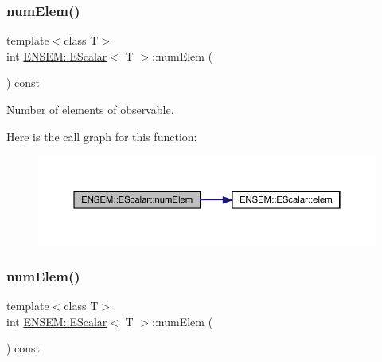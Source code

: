 \subsubsection{\texorpdfstring{numElem()}{numElem()}\hspace{0.1cm}{\footnotesize\ttfamily [1/3]}}
{\footnotesize\ttfamily template$<$class T$>$ \\
int \mbox{\hyperlink{classENSEM_1_1EScalar}{E\+N\+S\+E\+M\+::\+E\+Scalar}}$<$ T $>$\+::num\+Elem (\begin{DoxyParamCaption}{ }\end{DoxyParamCaption}) const\hspace{0.3cm}{\ttfamily [inline]}}



Number of elements of observable. 

Here is the call graph for this function\+:
\nopagebreak
\begin{figure}[H]
\begin{center}
\leavevmode
\includegraphics[width=350pt]{d0/d82/classENSEM_1_1EScalar_a63584568dc8b1817a57656cc072205b2_cgraph}
\end{center}
\end{figure}
\mbox{\label{classENSEM_1_1EScalar_a63584568dc8b1817a57656cc072205b2}} 
\subsubsection{\texorpdfstring{numElem()}{numElem()}\hspace{0.1cm}{\footnotesize\ttfamily [2/3]}}
{\footnotesize\ttfamily template$<$class T$>$ \\
int \mbox{\hyperlink{classENSEM_1_1EScalar}{E\+N\+S\+E\+M\+::\+E\+Scalar}}$<$ T $>$\+::num\+Elem (\begin{DoxyParamCaption}{ }\end{DoxyParamCaption}) const\hspace{0.3cm}{\ttfamily [inline]}}



